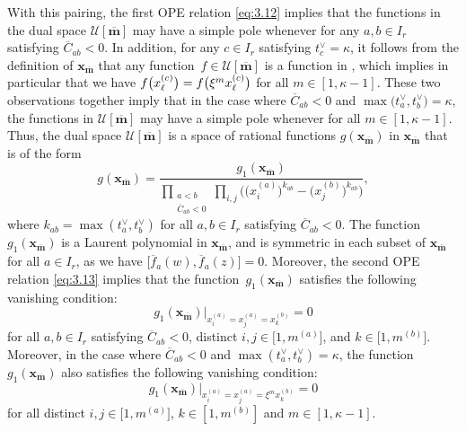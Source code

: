 \documentclass[pdftex]{sigma}
\numberwithin{equation}{section}
\begin{document}
With this pairing, the first OPE relation \eqref{eq:3.12} implies that the functions in the dual space $\mathcal{U}[\overline{\mathbf{m}}]$ may have a simple pole whenever  for any $a,b\in I_r$ satisfying $\overline{C}_{ab}<0$. In addition, for any $c\in I_r$ satisfying $t_c^{\vee}=\kappa$, it follows from the definition of $\mathbf{x}_{\overline{\mathbf{m}}}$ that any function~${f\in\mathcal{U}[\overline{\mathbf{m}}]}$ is a function in , which implies in particular that we have $\smash{f\bigl(x_{\ell}^{(c)}\bigr)}=\smash{f\bigl(\xi^mx_{\ell}^{(c)}\bigr)}$ for all $m\in[1,\kappa-1]$. These two observations together imply that in the case where $\overline{C}_{ab}<0$ and $\max\bigl(t_a^{\vee},t_b^{\vee}\bigr)= \kappa$, the functions in $\mathcal{U}[\overline{\mathbf{m}}]$ may have a simple pole whenever  for all $m\in[1,\kappa-1]$. Thus, the dual space $\mathcal{U}[\overline{\mathbf{m}}]$ is a space of rational functions $g(\mathbf{x}_{\overline{\mathbf{m}}})$ in $\mathbf{x}_{\overline{\mathbf{m}}}$ that is of the form
\begin{equation}\label{eq:3.18}
g(\mathbf{x}_{\overline{\mathbf{m}}})
=\frac{g_1(\mathbf{x}_{\overline{\mathbf{m}}})}{ \prod_{\substack{a<b\\\overline{C}_{ab}<0}} \prod_{i,j}\bigl(\bigl(x_i^{(a)}\bigr)^{k_{ab}}-\bigl(x_j^{(b)}\bigr)^{k_{ab}}\bigr)},
\end{equation}
where $k_{ab}=\max(t_a^{\vee},t_b^{\vee})$ for all $a,b\in I_r$ satisfying $\overline{C}_{ab}<0$. The function $g_1(\mathbf{x}_{\overline{\mathbf{m}}})$ is a Laurent polynomial in $\mathbf{x}_{\overline{\mathbf{m}}}$, and is symmetric in each subset  of $\mathbf{x}_{\overline{\mathbf{m}}}$ for all $a\in I_r$, as we have $\bigl[\overline{f}_a(w), \overline{f}_a(z)\bigr]=0$. Moreover, the second OPE relation \eqref{eq:3.13} implies that the function~$g_1(\mathbf{x}_{\overline{\mathbf{m}}})$ satisfies the following vanishing condition:
\begin{equation}\label{eq:3.19}
g_1(\mathbf{x}_{\overline{\mathbf{m}}})\big|_{x_i^{(a)}=x_j^{(a)}=x_k^{(b)}}=0
\end{equation}
for all $a,b\in I_r$ satisfying $\overline{C}_{ab}<0$, distinct $i,j\in \bigl[1,m^{(a)}\bigr]$, and $k\in\bigl[1,m^{(b)}\bigr]$. Moreover, in the case where $\overline{C}_{ab}<0$ and $\max(t_a^{\vee},t_b^{\vee})= \kappa$, the function $g_1(\mathbf{x}_{\overline{\mathbf{m}}})$ also satisfies the following vanishing condition:
\begin{equation}\label{eq:3.20}
g_1(\mathbf{x}_{\overline{\mathbf{m}}})\big|_{x_i^{(a)}=x_j^{(a)}=\xi^m x_k^{(b)}}=0
\end{equation}
for all distinct $i,j\in \bigl[1,m^{(a)}\bigr]$, $k\in[1,m^{(b)}]$ and $m\in[1,\kappa-1]$.
\end{document}
